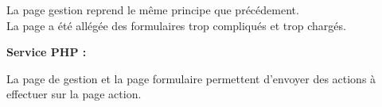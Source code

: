 			\begin{paragraphe}
                La page gestion reprend le même principe que précédement. \\
                La page a été allégée des formulaires trop compliqués et trop chargés.
			\end{paragraphe}

			\begin{paragraphe}
				\textbf{Service PHP :}
			\end{paragraphe}
            
            \begin{paragraphe}
                La page de gestion et la page formulaire permettent d'envoyer des actions à effectuer sur la page action.
			\end{paragraphe}
            
